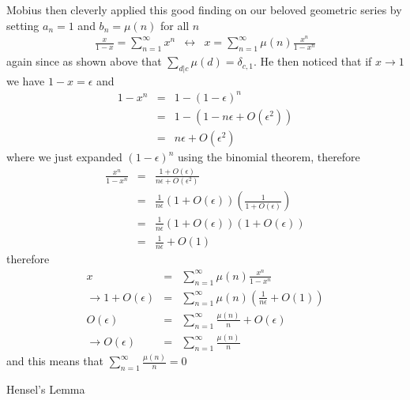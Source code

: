 \documentclass[aps,preprint,preprintnumbers,nofootinbib,showpacs,prd]{revtex4-1}
\newcommand{\nbea}{\begin{eqnarray*}}
\newcommand{\neea}{\end{eqnarray*}}
\begin{document}
Mobius then cleverly applied this good finding on our beloved geometric series by setting $a_n=1$ and $b_n=\mu(n)$ for all $n$
%
\nbea
\frac{x}{1-x} = \sum_{n=1}^\infty x^n &\longleftrightarrow& x = \sum_{n=1}^\infty \mu(n) \frac{x^n}{1-x^n}
\neea
%
again since as shown above that $\sum_{d|c}\mu(d) = \delta_{c,1}$. He then noticed that if $x\to1$ we have $1-x = \epsilon$ and
%
\nbea
1-x^n & = & 1- (1-\epsilon)^n \\
& = & 1 - ( 1 - n\epsilon + O(\epsilon^2) ) \\
& = & n\epsilon + O(\epsilon^2)
\neea
%
where we just expanded $(1-\epsilon)^n$ using the binomial theorem, therefore
%
\nbea
\frac{x^n}{1-x^n} & = & \frac{1 + O(\epsilon)}{n\epsilon + O(\epsilon^2)} \\
& = & \frac{1}{n\epsilon}(1+O(\epsilon))\left(\frac{1}{1 + O(\epsilon)}\right) \\
& = & \frac{1}{n\epsilon}(1+O(\epsilon))\left(1 + O(\epsilon)\right) \\
& = & \frac{1}{n\epsilon}+O(1)
\neea
%
therefore
%
\nbea
x & = & \sum_{n=1}^\infty \mu(n) \frac{x^n}{1-x^n} \\
\to 1 + O(\epsilon) & = & \sum_{n=1}^\infty \mu(n) \left(\frac{1}{n\epsilon}+O(1) \right) \\
O(\epsilon) & = & \sum_{n=1}^\infty \frac{\mu(n)}{n}+O(\epsilon) \\
\to O(\epsilon) & = & \sum_{n=1}^\infty \frac{\mu(n)}{n}
\neea
%
and this means that $\sum_{n=1}^\infty \frac{\mu(n)}{n} = 0$











Hensel's Lemma
\end{document}
